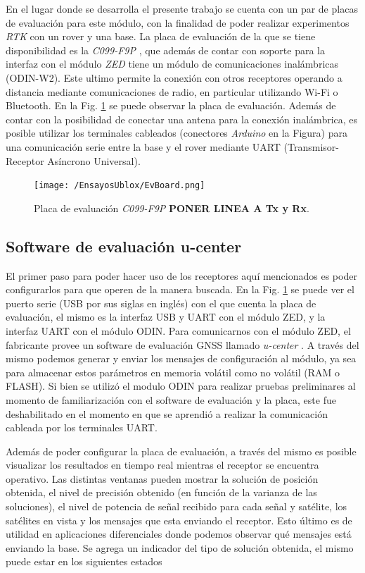\documentclass[a4paper,12pt,oneside,onecolumn,final,openright]{book}%
\begin{document}
	En el lugar donde se desarrolla el presente trabajo se cuenta con un par de placas de evaluación para este módulo, con la finalidad de poder realizar experimentos \textit{RTK} con un rover y una base. La placa de evaluación de la que se tiene disponibilidad es la \textit{C099-F9P} \cite{C099_ds}, que además de contar con soporte para la interfaz con el módulo \textit{ZED} tiene un módulo de comunicaciones inalámbricas (ODIN-W2). Este ultimo permite la conexión con otros receptores operando a distancia mediante comunicaciones de radio, en particular utilizando Wi-Fi o Bluetooth. En la Fig. \ref{fig:EvBoard} se puede observar la placa de evaluación. Además de contar con la posibilidad de conectar una antena para la conexión inalámbrica, es posible utilizar los terminales cableados (conectores \textit{Arduino} en la Figura) para una comunicación serie entre la base y el rover mediante UART (Transmisor-Receptor Asíncrono Universal).
	
\begin{figure}
    \centering
    \texttt{[image: /EnsayosUblox/EvBoard.png]}
    \caption{Placa de evaluación \textit{C099-F9P} \textbf{PONER LINEA A Tx y Rx}.}
    \label{fig:EvBoard}
\end{figure}
\subsection{Software de evaluación u-center}\label{sec:ucenter}
	El primer paso para poder hacer uso de los receptores aquí mencionados es poder configurarlos para que operen de la manera buscada. En la Fig. \ref{fig:EvBoard} se puede ver el puerto serie (USB por sus siglas en inglés) con el que cuenta la placa de evaluación, el mismo es la interfaz USB y UART con el módulo ZED, y la interfaz UART con el módulo ODIN. Para comunicarnos con el módulo ZED, el fabricante provee un software de evaluación GNSS llamado \textit{u-center} \cite{u_center}. A través del mismo podemos generar y enviar los mensajes de configuración al módulo, ya sea para almacenar estos parámetros en memoria volátil como no volátil (RAM o FLASH). Si bien se utilizó el modulo ODIN para realizar pruebas preliminares al momento de familiarización con el software de evaluación y la placa, este fue deshabilitado en el momento en que se aprendió a realizar la comunicación cableada por los terminales UART.
	
	Además de poder configurar la placa de evaluación, a través del mismo es posible visualizar los resultados en tiempo real mientras el receptor se encuentra operativo. Las distintas ventanas pueden mostrar la solución de posición obtenida, el nivel de precisión obtenido (en función de la varianza de las soluciones), el nivel de potencia de señal recibido para cada señal y satélite, los satélites en vista y los mensajes que esta enviando el receptor. Esto último es de utilidad en aplicaciones diferenciales donde podemos observar qué mensajes está enviando la base. Se agrega un indicador del tipo de solución obtenida, el mismo puede estar en los siguientes estados
\end{document}
